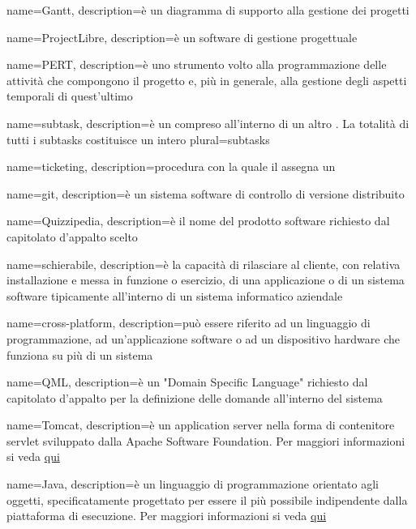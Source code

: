  {
	name=Gantt,
	description={è un diagramma di supporto alla gestione dei progetti}
}

 {
	name=ProjectLibre,
	description={è un software di gestione progettuale}
}

 {
	name=PERT,
	description={è uno strumento volto alla programmazione delle attività che compongono il progetto e, più in generale, alla gestione degli aspetti temporali di quest'ultimo}
}

 {
	name=subtask,
	description={è un  compreso all'interno di un altro . La totalità di tutti i subtasks costituisce un intero }
	plural=subtasks
}

 {
	name=ticketing,
	description={procedura con la quale il \RE assegna un }
}

 {
	name=git,
	description={è un sistema software di controllo di versione distribuito}
}

 {
	name=Quizzipedia,
	description={è il nome del prodotto software richiesto dal capitolato d'appalto scelto}
}

 {
	name=schierabile,
	description={è la capacità di rilasciare al cliente, con relativa installazione e messa in funzione o esercizio, di una applicazione o di un sistema software tipicamente all'interno di un sistema informatico aziendale}
}

 {
	name=cross-platform,
	description={può essere riferito ad un linguaggio di programmazione, ad un'applicazione software o ad un dispositivo hardware che funziona su più di un sistema}
}

 {
	name=QML,
	description={è un "Domain Specific Language" richiesto dal capitolato d'appalto per la definizione delle domande all'interno del sistema}
}

 {
	name=Tomcat,
	description={è un application server nella forma di contenitore servlet  sviluppato dalla Apache Software Foundation. Per maggiori informazioni si veda \href{https://it.wikipedia.org/wiki/Apache_Tomcat}{qui}}
}

 {
	name=Java,
	description={è un linguaggio di programmazione orientato agli oggetti, specificatamente progettato per essere il più possibile indipendente dalla piattaforma di esecuzione. Per maggiori informazioni si veda \href{https://it.wikipedia.org/wiki/Java_(linguaggio_di_programmazione)}{qui}}
}

